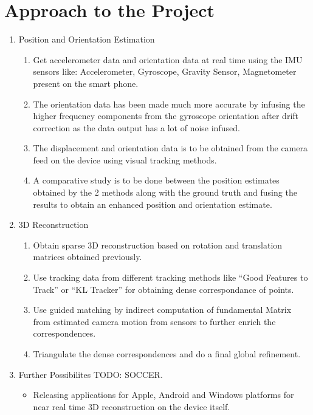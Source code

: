 \documentclass{article}
\begin{document}
	\section{Approach to the Project}
		\begin{enumerate}
			\item Position and Orientation Estimation
			\begin{enumerate}
				\item
					Get accelerometer data and orientation data at real time using the IMU sensors like: Accelerometer, Gyroscope, Gravity Sensor, Magnetometer present on the smart phone.
				\item
					The orientation data has been made much more accurate by infusing the higher frequency components from the gyroscope orientation after drift correction as the data output has a lot of noise infused.
				\item
					The displacement and orientation data is to be obtained from the camera feed on the device using visual tracking methods.
				\item
					A comparative study is to be done between the position estimates obtained by the 2 methods along with the ground truth and fusing the results to obtain an enhanced position and orientation estimate.
			\end{enumerate}
			\item 3D Reconstruction
			\begin{enumerate}
				\item 
					Obtain sparse 3D reconstruction based on rotation and translation matrices obtained previously.
				\item
					Use tracking data from different tracking methods like ``Good Features to Track'' or ``KL Tracker'' for obtaining dense correspondance of points.
				\item
					Use guided matching by indirect computation of fundamental Matrix from estimated camera motion from sensors to further enrich the correspondences.
				\item
					Triangulate the dense correspondences and do a final global refinement.					
			\end{enumerate}
			\item Further Possibilites TODO: SOCCER.
			\begin{itemize}
				\item Releasing applications for Apple, Android and Windows platforms for near real time 3D reconstruction on the device itself.
			\end{itemize}


\end{enumerate}
\end{document}
